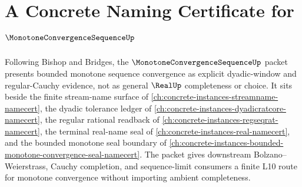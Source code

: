 \chapter{A Concrete Naming Certificate for $\MonotoneConvergenceSequenceUp$}
\label{ch:concrete-instances-monotone-convergence-sequence-namecert}

Following Bishop and Bridges, the $\MonotoneConvergenceSequenceUp$ packet presents bounded monotone sequence convergence as explicit dyadic-window and regular-Cauchy evidence, not as general $\RealUp$ completeness or choice. It sits beside the finite stream-name surface of \autoref{ch:concrete-instances-streamname-namecert}, the dyadic tolerance ledger of \autoref{ch:concrete-instances-dyadicratcore-namecert}, the regular rational readback of \autoref{ch:concrete-instances-regseqrat-namecert}, the terminal real-name seal of \autoref{ch:concrete-instances-real-namecert}, and the bounded monotone seal boundary of \autoref{ch:concrete-instances-bounded-monotone-convergence-seal-namecert}. The packet gives downstream Bolzano--Weierstrass, Cauchy completion, and sequence-limit consumers a finite L10 route for monotone convergence without importing ambient completeness.

